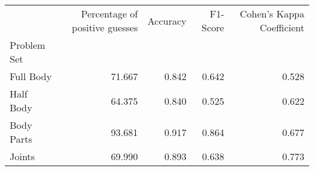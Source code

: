 \begin{table}
    \caption[]{}
    \label{}
    \begin{tabular}{lrrrr}
\hline
{} &  Percentage of positive guesses &  Accuracy &  F1-Score &  Cohen's Kappa Coefficient \\
Problem Set   &                                 &           &           &                            \\
\hline
Full Body  &                          71.667 &     0.842 &     0.642 &                      0.528 \\
Half Body  &                          64.375 &     0.840 &     0.525 &                      0.622 \\
Body Parts &                          93.681 &     0.917 &     0.864 &                      0.677 \\
Joints     &                          69.990 &     0.893 &     0.638 &                      0.773 \\
\hline
\end{tabular}

\end{table}